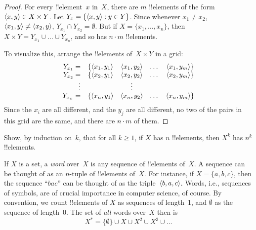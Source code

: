 \documentclass[../../../include/open-logic-section]{subfiles}
\begin{document}
\begin{proof}
For every !!{element}~$x$ in~$X$, there are $m$ !!{element}s of the
form $\langle x, y \rangle \in X \times Y$. Let $Y_x = \{ \langle x, y \rangle : y
  \in Y \}$. Since whenever $x_1 \neq x_2$, $\langle x_1, y \rangle \neq
\langle x_2, y \rangle$, $Y_{x_1} \cap Y_{x_2} = \emptyset$. But if $X = \{x_1,
\dots, x_n\}$, then $X \times Y = Y_{x_1} \cup \dots \cup Y_{x_n}$, and so has
$n\cdot m$ !!{element}s.

To visualize this, arrange the !!{element}s of~$X \times Y$ in a grid:
\[
\begin{array}{rcccc}
  Y_{x_1} = & \{\tuple{x_1, y_1} & \tuple{x_1, y_2} & \dots & \tuple{x_1, y_m}\}\\
  Y_{x_2} = & \{\tuple{x_2, y_1} & \tuple{x_2, y_2} & \dots & \tuple{x_2, y_m}\}\\
  \vdots & & \vdots\\
  Y_{x_n} = & \{\tuple{x_n, y_1} & \tuple{x_n, y_2} & \dots & \tuple{x_n, y_m}\}
\end{array}
\]
Since the $x_i$ are all different, and the $y_j$ are all different, no
two of the pairs in this grid are the same, and there are $n\cdot m$
of them.
\end{proof}

\begin{prob}
Show, by induction on~$k$, that for all $k \ge 1$, if $X$ has $n$
!!{element}s, then $X^k$ has $n^k$ !!{element}s.
\end{prob}

\begin{ex}
If $X$ is a set, a \emph{word} over~$X$ is any sequence of
!!{element}s of~$X$. A sequence can be thought of as an $n$-tuple of
!!{element}s of~$X$. For instance, if $X = \{a, b, c\}$, then the
sequence ``$bac$'' can be thought of as the triple~$\langle b, a, c \rangle$.
Words, i.e., sequences of symbols, are of crucial importance in
computer science, of course. By convention, we count !!{element}s of
$X$ as sequences of length~1, and $\emptyset$ as the sequence of
length~0. The set of \emph{all} words over~$X$ then is
\[
X^* = \{\emptyset\} \cup X \cup X^2 \cup X^3 \cup \dots
\]
\end{ex}
\end{document}
